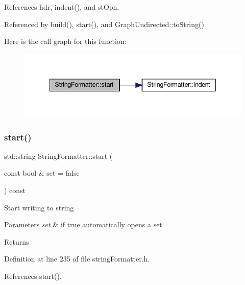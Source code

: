 References hdr, indent(), and st\+Opn.



Referenced by build(), start(), and Graph\+Undirected\+::to\+String().

Here is the call graph for this function\+:
\nopagebreak
\begin{figure}[H]
\begin{center}
\leavevmode
\includegraphics[width=342pt]{classStringFormatter_abfaada84b0472d0a41dcd5a56e534808_cgraph}
\end{center}
\end{figure}
\mbox{\label{classStringFormatter_aa952e1ec1047f7f0e746f678042da824}} 
\subsubsection{\texorpdfstring{start()}{start()}\hspace{0.1cm}{\footnotesize\ttfamily [2/2]}}
{\footnotesize\ttfamily std\+::string String\+Formatter\+::start (\begin{DoxyParamCaption}\item[{const bool \&}]{set = {\ttfamily false} }\end{DoxyParamCaption}) const\hspace{0.3cm}{\ttfamily [inline]}}

Start writing to string 
\begin{DoxyParams}{Parameters}
{\em set} & if true automatically opens a set \\
\hline
\end{DoxyParams}
\begin{DoxyReturn}{Returns}

\end{DoxyReturn}


Definition at line 235 of file string\+Formatter.\+h.



References start().

